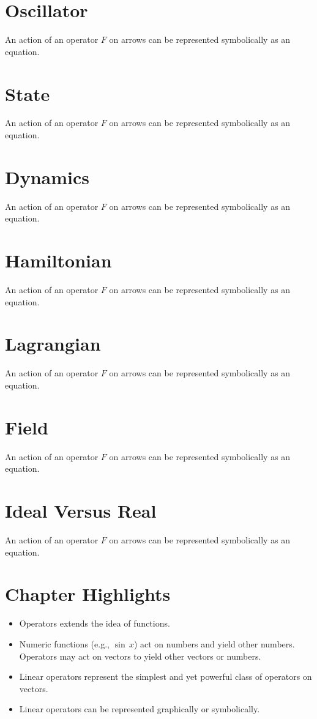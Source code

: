 \section{Oscillator}\label{sec:Oscillator}
An action of an operator $F$ on arrows can be represented symbolically
as an equation.

\section{State}\label{sec:State}
An action of an operator $F$ on arrows can be represented symbolically
as an equation.

\section{Dynamics}\label{sec:Dynamics}
An action of an operator $F$ on arrows can be represented symbolically
as an equation.

\section{Hamiltonian}\label{sec:Hamiltonian}
An action of an operator $F$ on arrows can be represented symbolically
as an equation.

\section{Lagrangian}\label{sec:Lagrangian}
An action of an operator $F$ on arrows can be represented symbolically
as an equation.

\section{Field}\label{sec:Field}
An action of an operator $F$ on arrows can be represented symbolically
as an equation.

\section{Ideal Versus Real}\label{sec:IdealVsReal}
An action of an operator $F$ on arrows can be represented symbolically
as an equation.



\section*{Chapter Highlights}
{\chhc
  \it  
\begin{itemize}
\item Operators extends the idea of functions.
\item Numeric functions (e.g., $\sin\,x$) act on numbers and yield
  other numbers. Operators may act on vectors to yield other vectors
  or numbers.
\item Linear operators represent the simplest and yet powerful class
  of operators on vectors.
\item Linear operators can be represented graphically or symbolically.
\end{itemize}

}
